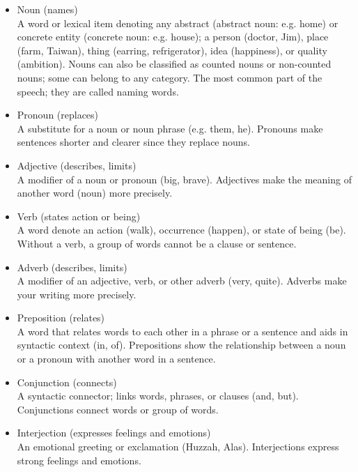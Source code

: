 \begin{itemize}
	\item Noun (names)\\
	A word or lexical item denoting any abstract (abstract noun: e.g. home) or concrete entity (concrete noun: e.g. house); a person (doctor, Jim), place (farm, Taiwan), thing (earring, refrigerator), idea (happiness), or quality (ambition). 
	Nouns can also be classified as counted nouns or non-counted nouns; some can belong to any category. 
	The most common part of the speech; they are called naming words.
	
	\item Pronoun (replaces)\\
	A substitute for a noun or noun phrase (e.g. them, he). Pronouns make sentences shorter and clearer since they replace nouns.
	
	\item Adjective (describes, limits)\\
	A modifier of a noun or pronoun (big, brave). 
	Adjectives make the meaning of another word (noun) more precisely.
	
	\item Verb (states action or being)\\
	A word denote an action (walk), occurrence (happen), or state of being (be).
	Without a verb, a group of words cannot be a clause or sentence.
	\item Adverb (describes, limits)\\
	A modifier of an adjective, verb, or other adverb (very, quite). 
	Adverbs make your writing more precisely.
	
	\item Preposition (relates)\\
	A word that relates words to each other in a phrase or a sentence and aids in syntactic context (in, of). 
	Prepositions show the relationship between a noun or a pronoun with another word in a sentence.
	
	\item Conjunction (connects)\\
	A syntactic connector; links words, phrases, or clauses (and, but). 
	Conjunctions connect words or group of words.
	
	\item Interjection (expresses feelings and emotions)\\
	An emotional greeting or exclamation (Huzzah, Alas). 
	Interjections express strong feelings and emotions.
\end{itemize}

